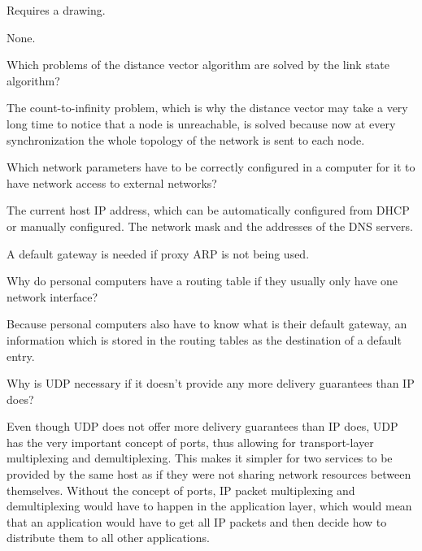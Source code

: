 \begin{Exercise}
Requires a drawing.
\end{Exercise}
\begin{Answer}
None.
\end{Answer}

\begin{Exercise}
Which problems of the distance vector algorithm are solved by the link state algorithm?
\end{Exercise}
\begin{Answer}
The count-to-infinity problem, which is why the distance vector may take a very long time to notice that a node is unreachable, is solved because now at every synchronization the whole topology of the network is sent to each node.
\end{Answer}

\begin{Exercise}
Which network parameters have to be correctly configured in a computer for it to have network access to external networks?
\end{Exercise}
\begin{Answer}
The current host IP address, which can be automatically configured from DHCP or manually configured.
The network mask and the addresses of the DNS servers.

A default gateway is needed if proxy ARP is not being used.
\end{Answer}

\begin{Exercise}
Why do personal computers have a routing table if they usually only have one network interface?
\end{Exercise}
\begin{Answer}
Because personal computers also have to know what is their default gateway, an information which is stored in the routing tables as the destination of a default entry.
\end{Answer}

\begin{Exercise}
Why is UDP necessary if it doesn't provide any more delivery guarantees than IP does?
\end{Exercise}
\begin{Answer}
Even though UDP does not offer more delivery guarantees than IP does, UDP has the very important concept of ports, thus allowing for transport-layer multiplexing and demultiplexing.
This makes it simpler for two services to be provided by the same host as if they were not sharing network resources between themselves.
Without the concept of ports, IP packet multiplexing and demultiplexing would have to happen in the application layer, which would mean that an application would have to get all IP packets and then decide how to distribute them to all other applications.
\end{Answer}

